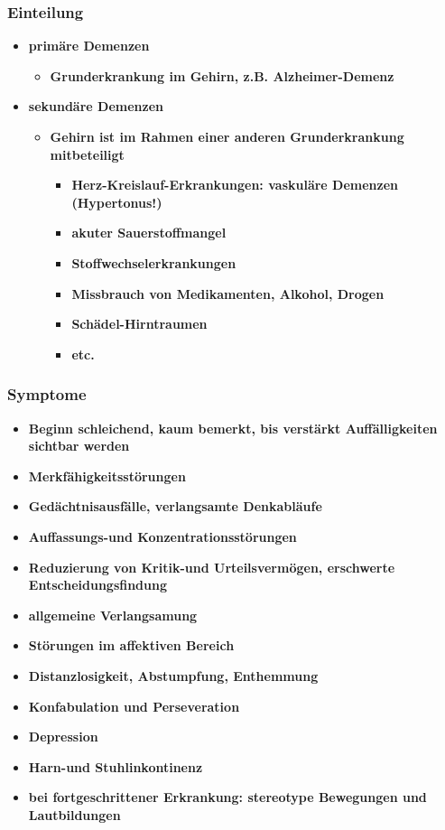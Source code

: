 	\subsubsection{Einteilung}
		\begin{itemize}
			\item \textbf{primäre Demenzen}
				\begin{itemize}
					\item \textbf{Grunderkrankung im Gehirn, z.B. Alzheimer-Demenz}
				\end{itemize}
			\item \textbf{sekundäre Demenzen}
				\begin{itemize}
					\item \textbf{Gehirn ist im Rahmen einer anderen Grunderkrankung mitbeteiligt}
						\begin{itemize}
							\item \textbf{Herz-Kreislauf-Erkrankungen: vaskuläre Demenzen (Hypertonus!)}
							\item \textbf{akuter Sauerstoffmangel}
							\item \textbf{Stoffwechselerkrankungen}
							\item \textbf{Missbrauch von Medikamenten, Alkohol, Drogen}
							\item \textbf{Schädel-Hirntraumen}
							\item \textbf{etc.}
						\end{itemize}
				\end{itemize}
		\end{itemize}
	\subsubsection{Symptome}
		\begin{itemize}
			\item \textbf{Beginn schleichend, kaum bemerkt, bis verstärkt Auffälligkeiten sichtbar werden}
			\item \textbf{Merkfähigkeitsstörungen}
			\item \textbf{Gedächtnisausfälle, verlangsamte Denkabläufe}
			\item \textbf{Auffassungs-und Konzentrationsstörungen}
			\item \textbf{Reduzierung von Kritik-und Urteilsvermögen, erschwerte Entscheidungsfindung}
			\item \textbf{allgemeine Verlangsamung}
			\item \textbf{Störungen im affektiven Bereich}
			\item \textbf{Distanzlosigkeit, Abstumpfung, Enthemmung}
			\item \textbf{Konfabulation und Perseveration}
			\item \textbf{Depression}
			\item \textbf{Harn-und Stuhlinkontinenz}
			\item \textbf{bei fortgeschrittener Erkrankung: stereotype Bewegungen und  Lautbildungen}
		\end{itemize}
		
